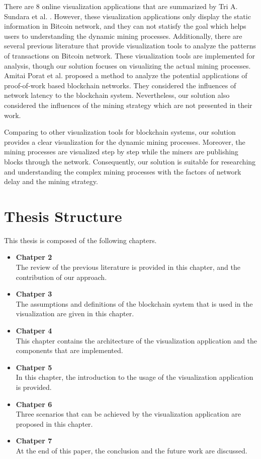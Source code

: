 There are 8 online visualization applications that are summarized by Tri A. Sundara et al. \cite{Sundara2017}. However, these visualization applications only display the static information in Bitcoin network, and they can not statisfy the goal which helps users to understanding the dynamic mining processes. Additionally, there are several previous literature that provide visualization tools \cite{Battista2015, Kuzuno2017, McGinn2016, Saublet2015, Fleder2015, Baumann2014} to analyze the patterns of transactions on Bitcoin network. These visualization tools are implemented for analysis, though our solution focuses on visualizing the actual mining processes. Amitai Porat et al. \cite{Porat} proposed a method to analyze the potential applications of proof-of-work based blockchain networks. They considered the influences of network latency to the blockchain system. Nevertheless, our solution also considered the influences of the mining strategy which are not presented in their work.

Comparing to other visualization tools for blockchain systems, our solution provides a clear visualization for the dynamic mining processes. Moreover, the mining processes are visualized step by step while the miners are publishing blocks through the network. Consequently, our solution is suitable for researching and understanding the complex mining processes with the factors of network delay and the mining strategy.

\section{Thesis Structure}

This thesis is composed of the following chapters.

\begin{itemize}
    \item \textbf{Chatper 2} \\
        The review of the previous literature is provided in this chapter, and the contribution of our approach.
    \item \textbf{Chatper 3} \\
        The assumptions and definitions of the blockchain system that is used in the visualization are given in this chapter.
    \item \textbf{Chatper 4} \\
        This chapter contains the architecture of the visualization application and the components that are implemented.
    \item \textbf{Chatper 5} \\
        In this chapter, the introduction to the usage of the visualization application is provided.
    \item \textbf{Chatper 6} \\
        Three scenarios that can be achieved by the visualization application are proposed in this chapter.
    \item \textbf{Chatper 7} \\
        At the end of this paper, the conclusion and the future work are discussed.
\end{itemize}
